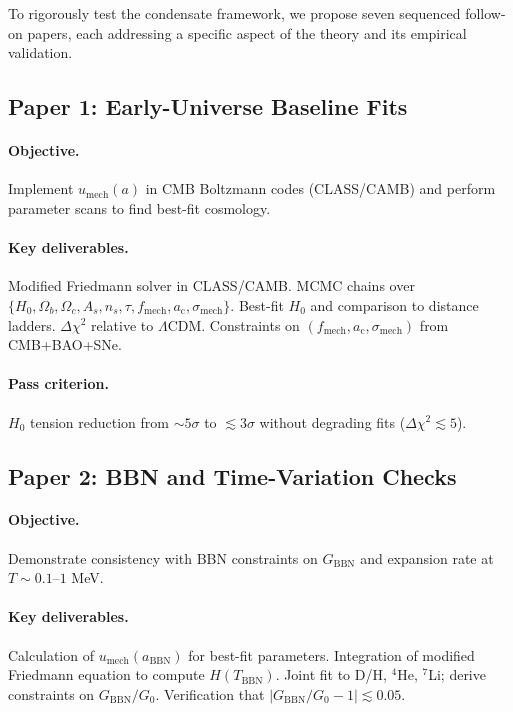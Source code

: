 \documentclass[11pt,a4paper]{article}
\newcommand{\ac}{a_{\mathrm{c}}}
\newcommand{\sigmamech}{\sigma_{\mathrm{mech}}}
\newcommand{\fmech}{f_{\mathrm{mech}}}
\newcommand{\umech}{u_{\mathrm{mech}}}
\theoremstyle{definition}
\begin{document}
To rigorously test the condensate framework, we propose seven sequenced follow-on papers, each addressing a specific aspect of the theory and its empirical validation.

\subsection{Paper 1: Early-Universe Baseline Fits}
\label{sec:paper1}

\paragraph{Objective.}
Implement $\umech(a)$ in CMB Boltzmann codes (CLASS/CAMB) and perform parameter scans to find best-fit cosmology.

\paragraph{Key deliverables.}
Modified Friedmann solver in CLASS/CAMB. MCMC chains over $\{H_0, \Omega_b, \Omega_c, A_s, n_s, \tau, \fmech, \ac, \sigmamech\}$. Best-fit $H_0$ and comparison to distance ladders. $\Delta\chi^2$ relative to $\Lambda$CDM. Constraints on $(\fmech, \ac, \sigmamech)$ from CMB+BAO+SNe.

\paragraph{Pass criterion.}
$H_0$ tension reduction from $\sim 5\sigma$ to $\lesssim 3\sigma$ without degrading fits ($\Delta\chi^2 \lesssim 5$).

\subsection{Paper 2: BBN and Time-Variation Checks}
\label{sec:paper2}

\paragraph{Objective.}
Demonstrate consistency with BBN constraints on $G_{\mathrm{BBN}}$ and expansion rate at $T \sim 0.1$--$1$ MeV.

\paragraph{Key deliverables.}
Calculation of $\umech(a_{\mathrm{BBN}})$ for best-fit parameters. Integration of modified Friedmann equation to compute $H(T_{\mathrm{BBN}})$. Joint fit to D/H, $^4$He, $^7$Li; derive constraints on $G_{\mathrm{BBN}}/G_0$. Verification that $|G_{\mathrm{BBN}}/G_0 - 1| \lesssim 0.05$.
\end{document}

